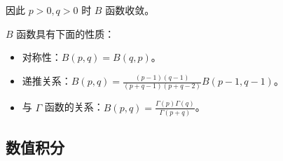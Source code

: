 因此 $p > 0, q > 0$ 时 $B$ 函数收敛。

$B$ 函数具有下面的性质：
\begin{itemize}
	\item 对称性：$B(p, q) = B(q, p)$。
	\item 递推关系：$\displaystyle B(p, q) = \frac{(p - 1)(q - 1)}{(p + q - 1)(p + q - 2)} B(p - 1, q - 1)$。
	\item 与 $\Gamma$ 函数的关系：$\displaystyle B(p, q) = \frac{\Gamma(p) \Gamma(q)}{\Gamma(p + q)}$。
\end{itemize}

\subsection{数值积分}
